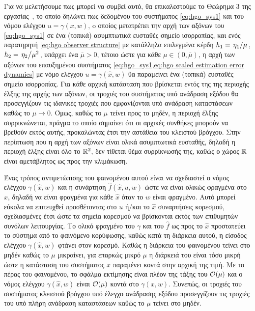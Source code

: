 Για να μελετήσουμε πως μπορεί να συμβεί αυτό, θα επικαλεστούμε το Θεώρημα 3 της εργασίας~\cite{Esfandiari1992}, το οποίο δηλώνει πως δεδομένου του συστήματος \cref{eq:hgo_sys1} και του νόμου ελέγχου $u = \gamma(x,w)$, o οποίος μετατρέπει την αρχή των αξόνων του \cref{eq:hgo_sys1} σε ένα (τοπικά) ασυμπτωτικά ευσταθές σημείο ισορροπίας, και ενός παρατηρητή \cref{eq:hgo observer structure} με κατάλληλα επιλεγμένα κέρδη $h_1 = \flatfrac{\eta_1}{\mu}$, $h_2 = \flatfrac{\eta_2}{\mu^2}$, υπάρχει ένα $\bar \mu > 0$, τέτοιο ώστε για κάθε $\mu \in (0, \bar \mu)$, η αρχή των αξόνων του επαυξημένου συστήματος \cref{eq:hgo_sys1,eq:hgo scaled estimation error dynamics} με νόμο ελέγχου $u = \gamma(\hat x, w)$ θα παραμείνει ένα (τοπικά) ευσταθές σημείο ισορροπίας. Για κάθε αρχική κατάσταση που βρίσκεται εντός της της περιοχής έλξης της αρχής των αξόνων, οι τροχιές του συστήματος υπό ανάδραση εξόδου θα προσεγγίζουν τις ιδανικές τροχιές που εμφανίζονται υπό ανάδραση καταστάσεων καθώς το $\mu \rightarrow 0$. Όμως, καθώς το $\mu$ τείνει προς το μηδέν, η περιοχή έλξης συρρικνώνεται, πράγμα το οποίο σημαίνει ότι οι αρχικές συνθήκες μπορούν να βρεθούν εκτός αυτής, προκαλώντας έτσι την αστάθεια του κλειστού βρόγχου. Στην περίπτωση που η αρχή των αξόνων είναι ολικά ασυμπτωτικά ευσταθής, δηλαδή η περιοχή έλξης είναι όλο το $\mathbb{R}^2$, δεν τίθεται θέμα συρρίκνωσής της, καθώς ο χώρος $\mathbb{R}$ είναι αμετάβλητος ως προς την κλιμάκωση.

Ένας τρόπος αντιμετώπισης του φαινομένου αυτού είναι να σχεδιαστεί ο νόμος ελέγχου $\gamma(\hat x, w)$ και η συνάρτηση $\hat f(\hat x, u, w)$ ώστε να είναι ολικώς φραγμένα στο $\hat x$, δηλαδή να είναι φραγμένα για κάθε $\hat x$ όταν το $w$ είναι φραγμένο. Αυτό μπορεί εύκολα να επιτευχθεί προσθέτοντας στο $u$ ή/και το $\hat x$ συναρτήσεις κορεσμού, σχεδιασμένες έτσι ώστε τα σημεία κορεσμού να βρίσκονται εκτός των επιθυμητών συνόλων λειτουργίας. Το ολικό φραγμένο του $\gamma$ και του $\hat f$ ως προς το $\hat x$ προστατεύει το σύστημα από το φαινόμενο κορύφωσης, καθώς κατά τη διάρκεια αυτού, η είσοδος ελέγχου $\gamma(\hat x, w)$ φτάνει στον κορεσμό. Καθώς η διάρκεια του φαινομένου τείνει στο μηδέν καθώς το $\mu$ μικραίνει, για επαρκώς μικρό $\mu$ η διάρκειά του είναι τόσο μικρή ώστε η κατάσταση του συστήματος $x$ παραμένει κοντά στην αρχική της τιμή. Με το πέρας του φαινομένου, το σφάλμα εκτίμησης είναι πλέον της τάξης του $\bigo{\mu}$ και ο νόμος ελέγχου $\gamma(\hat x, w)$ είναι $\bigo{\mu}$ κοντά στο $\gamma(x, w)$. Συνεπώς, οι τροχιές του συστήματος κλειστού βρόγχου υπό έλεγχο ανάδρασης εξόδου προσεγγίζουν τις τροχιές του υπό πλήρη ανάδραση καταστάσεων καθώς το $\mu$ τείνει στο μηδέν.

